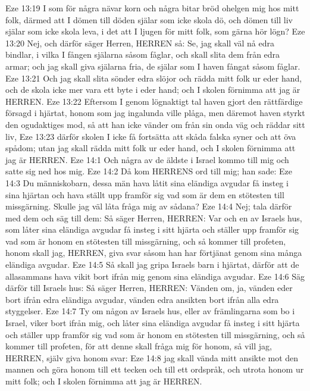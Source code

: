 Eze 13:19  I som för några nävar korn och några bitar bröd ohelgen mig hos mitt folk, därmed att I dömen till döden själar som icke skola dö, och dömen till liv själar som icke skola leva, i det att I ljugen för mitt folk, som gärna hör lögn?
Eze 13:20  Nej, och därför säger Herren, HERREN så: Se, jag skall väl nå edra bindlar, i vilka I fången själarna såsom fåglar, och skall slita dem från edra armar; och jag skall giva själarna fria, de själar som I haven fångat såsom fåglar.
Eze 13:21  Och jag skall slita sönder edra slöjor och rädda mitt folk ur eder hand, och de skola icke mer vara ett byte i eder hand; och I skolen förnimma att jag är HERREN.
Eze 13:22  Eftersom I genom lögnaktigt tal haven gjort den rättfärdige försagd i hjärtat, honom som jag ingalunda ville plåga, men däremot haven styrkt den ogudaktiges mod, så att han icke vänder om från sin onda väg och räddar sitt liv,
Eze 13:23  därför skolen I icke få fortsätta att skåda falska syner och att öva spådom; utan jag skall rädda mitt folk ur eder hand, och I skolen förnimma att jag är HERREN.
Eze 14:1  Och några av de äldste i Israel kommo till mig och satte sig ned hos mig.
Eze 14:2  Då kom HERRENS ord till mig; han sade:
Eze 14:3  Du människobarn, dessa män hava låtit sina eländiga avgudar få insteg i sina hjärtan och hava ställt upp framför sig vad som är dem en stötesten till missgärning. Skulle jag väl låta fråga mig av sådana?
Eze 14:4  Nej; tala därför med dem och säg till dem: Så säger Herren, HERREN: Var och en av Israels hus, som låter sina eländiga avgudar få insteg i sitt hjärta och ställer upp framför sig vad som är honom en stötesten till missgärning, och så kommer till profeten, honom skall jag, HERREN, giva svar såsom han har förtjänat genom sina många eländiga avgudar.
Eze 14:5  Så skall jag gripa Israels barn i hjärtat, därför att de allasammans hava vikit bort ifrån mig genom sina eländiga avgudar.
Eze 14:6  Säg därför till Israels hus: Så säger Herren, HERREN: Vänden om, ja, vänden eder bort ifrån edra eländiga avgudar, vänden edra ansikten bort ifrån alla edra styggelser.
Eze 14:7  Ty om någon av Israels hus, eller av främlingarna som bo i Israel, viker bort ifrån mig, och låter sina eländiga avgudar få insteg i sitt hjärta och ställer upp framför sig vad som är honom en stötesten till missgärning, och så kommer till profeten, för att denne skall fråga mig för honom, så vill jag, HERREN, själv giva honom svar:
Eze 14:8  jag skall vända mitt ansikte mot den mannen och göra honom till ett tecken och till ett ordspråk, och utrota honom ur mitt folk; och I skolen förnimma att jag är HERREN.
